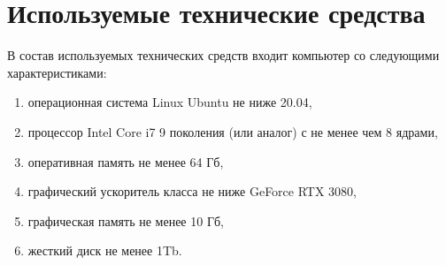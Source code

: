 \newpage
\section{Используемые технические средства}

В состав используемых технических средств входит компьютер со следующими характеристиками:
\begin{enumerate}
    \item операционная система Linux Ubuntu не ниже 20.04,
    \item процессор Intel Core i7 9 поколения (или аналог) с не менее чем 8 ядрами,
    \item оперативная память не менее 64 Гб,
    \item графический ускоритель класса не ниже GeForce RTX 3080,
    \item графическая память не менее 10 Гб,
    \item жесткий диск не менее 1Tb.
\end{enumerate}
